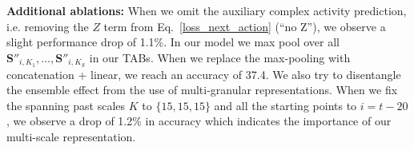 \documentclass[runningheads]{llncs}
\makeatletter
\newcommand*{\ie}{i.e.\@\xspace}
\makeatother
\begin{document}
\textbf{Additional ablations:} When we omit the auxiliary complex activity prediction, \ie removing the $Z$ term from Eq.~\ref{loss_next_action} (``no Z''), we observe a slight performance drop of 1.1\%. In our model we max pool over all $\textbf{S}''_{i,K_1}, ..., \textbf{S}''_{i,K_S}$ in our TABs. When we replace the max-pooling with concatenation + linear, we reach an accuracy of 37.4.
We also try to disentangle the ensemble effect from the use of multi-granular representations. When we fix the spanning past scales $K$ to $\{15,15,15\}$ and all the starting points to $i=t-20$, we observe a drop of 1.2\% in accuracy which indicates the importance of our multi-scale representation.


\begin{table}[t] 
\centering
{}
\caption{Next action anticipation comparisons on Breakfast and 50Salads, given different frame inputs frame inputs, GT action labels, Fisher vectors and I3D features.}
\label{tab:SOA_next_50Salads} 
\end{table} 
\end{document}
